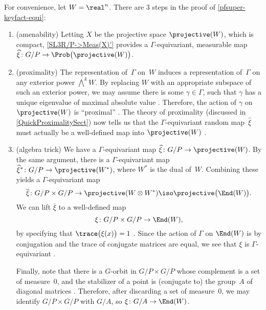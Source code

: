For convenience, let $W = \real^n$. There are 3 steps in the proof of \cref{pfsuper-keyfact-equi}:
	\begin{enumerate}
	\item (amenability) Letting $X$ be the projective space $\projective(W)$, which is compact, \cref{SL3R/P->Meas(X)'} provides a $\Gamma$-equivariant, measurable map $ \widehat \xi \colon G/P \to \Prob \bigl( \projective(W) \bigr)$.
	\item (proximality) The representation of~$\Gamma$ on~$W$ induces a representation of~$\Gamma$ on any exterior power $\bigwedge^k W$. By replacing $W$ with an appropriate subspace of such an exterior power, we may assume there is some $\gamma \in \Gamma$, such that $\gamma$ has a unique eigenvalue of maximal absolute value . Therefore, the action of $\gamma$ on $\projective(W)$ is ``proximal'' . The theory of proximality (discussed in \cref{QuickProximalitySect}) now tells us that the $\Gamma$-equivariant random map~$\widehat\xi$ must actually be a well-defined map into $\projective(W)$ . 

\item (algebra trick) We have a $\Gamma$-equivariant map $\widehat\xi \colon G/P \to \projective(W)$. By the same argument, there is a $\Gamma$-equivariant map $\widehat\xi^* \colon G/P \to \projective(W^*)$, where $W^*$ is the dual of~$W$. Combining these yields a $\Gamma$-equivariant map 
	$$\overline\xi \colon G/P \times G/P \to \projective(W \otimes W^*) \iso \projective \bigl( \End(W) \bigr) .$$
We can lift $\overline\xi$ to a well-defined map 
	$$\xi \colon G/P \times G/P \to \End(W), $$
by specifying that $\trace \bigl( \xi(x) \bigr) = 1$ .
Since the action of $\Gamma$ on $\End(W)$ is by conjugation 
and the trace of conjugate matrices are equal, we see that $\xi$ is $\Gamma$-equivariant .

Finally, note that there is a $G$-orbit in $G/P \times G/P$ whose complement is a set of measure~$0$, and the stabilizer of a point is (conjugate to) the group~$A$ of diagonal matrices . Therefore, after discarding a set of measure~$0$, we may identify $G/P \times G/P$ with $G/A$, so $\xi \colon G/A \to \End(W)$.
	\end{enumerate}


